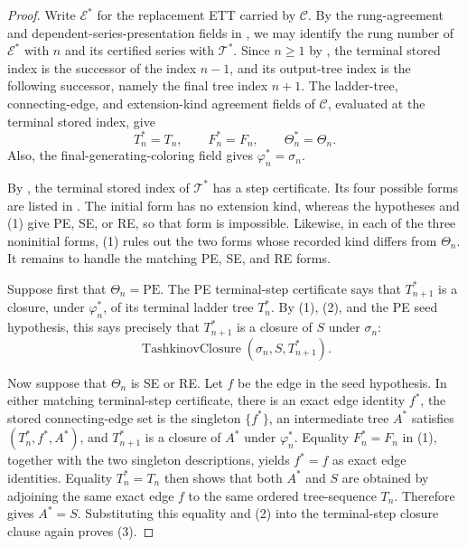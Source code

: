\begin{proof}
Write \(\mathcal E^*\) for the replacement ETT carried by \(\mathcal C\).
By the rung-agreement and dependent-series-presentation fields in
, we may identify the rung number
of \(\mathcal E^*\) with \(n\) and its certified series with
\(\mathcal T^*\).  Since \(n\geq 1\) by
, the terminal stored index is the successor
of the index \(n-1\), and its output-tree index is the following successor,
namely the final tree index \(n+1\).  The ladder-tree, connecting-edge, and
extension-kind agreement fields of \(\mathcal C\), evaluated at the terminal
stored index, give
\[
 T_n^*=T_n,\qquad F_n^*=F_n,\qquad \Theta_n^*=\Theta_n.       \tag{1}
\]
Also, the final-generating-coloring field gives
\(\varphi_n^*=\sigma_n\).                                      

By , the terminal stored index of
\(\mathcal T^*\) has a step certificate.  Its four possible forms are
listed in .  The
initial form has no extension kind, whereas the hypotheses and (1) give
PE, SE, or RE, so that form is impossible.  Likewise, in each of the three
noninitial forms, (1) rules out the two forms whose recorded kind differs
from \(\Theta_n\).  It remains to handle the matching PE, SE, and RE forms.

Suppose first that \(\Theta_n=\mathrm{PE}\).  The PE terminal-step
certificate says that \(T^*_{n+1}\) is a closure, under
\(\varphi_n^*\), of its terminal ladder tree \(T_n^*\).  By (1), (2), and
the PE seed hypothesis, this says precisely that \(T^*_{n+1}\) is a
closure of \(S\) under \(\sigma_n\):
\[
              \operatorname{TashkinovClosure}
                (\sigma_n,S,T^*_{n+1}).                          \tag{3}
\]

Now suppose that \(\Theta_n\) is SE or RE.  Let \(f\) be the edge in the
seed hypothesis.  In either matching terminal-step certificate, there is
an exact edge identity \(f^*\), the stored connecting-edge set is the
singleton \(\{f^*\}\), an intermediate tree \(A^*\) satisfies
\((T_n^*,f^*,A^*)\), and
\(T^*_{n+1}\) is a closure of \(A^*\) under \(\varphi_n^*\).  Equality
\(F_n^*=F_n\) in (1), together with the two singleton descriptions, yields
\(f^*=f\) as exact edge identities.  Equality \(T_n^*=T_n\) then shows
that both \(A^*\) and \(S\) are obtained by adjoining the same exact edge
\(f\) to the same ordered tree-sequence \(T_n\).  Therefore
 gives \(A^*=S\).  Substituting this
equality and (2) into the terminal-step closure clause again proves (3).


\end{proof}
